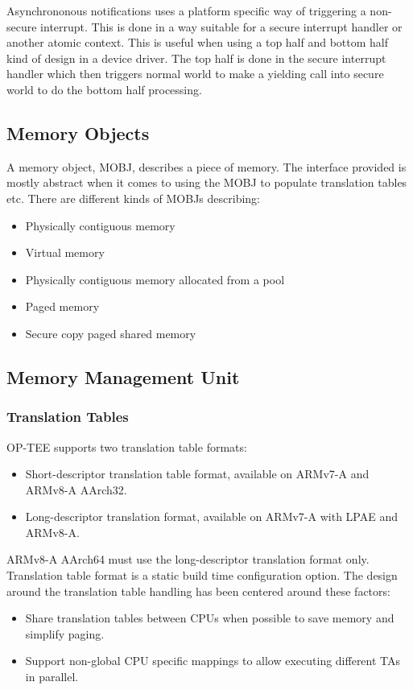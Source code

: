 \documentclass{article}
\begin{document}
Asynchrononous notifications uses a platform specific way of triggering a non-secure interrupt. This is done in a way suitable for a secure interrupt handler or another atomic context. This is useful when using a top half and bottom half kind of design in a device driver. The top half is done in the secure interrupt handler which then triggers normal world to make a yielding call into secure world to do the bottom half processing.

\subsection{Memory Objects}

A memory object, MOBJ, describes a piece of memory. The interface provided is mostly abstract when it comes to using the MOBJ to populate translation tables etc. There are different kinds of MOBJs describing:\begin{itemize}
\item Physically contiguous memory
\item Virtual memory
\item Physically contiguous memory allocated from a pool
\item Paged memory
\item Secure copy paged shared memory
\end{itemize}

\subsection{Memory Management Unit}

\subsubsection{Translation Tables}

OP-TEE supports two translation table formats:
\begin{itemize}
\item Short-descriptor translation table format, available on ARMv7-A and ARMv8-A AArch32.
\item Long-descriptor translation format, available on ARMv7-A with LPAE and ARMv8-A.
\end{itemize}
ARMv8-A AArch64 must use the long-descriptor translation format only. Translation table format is a static build time configuration option. The design around the translation table handling has been centered around these factors:
\begin{itemize}
\item Share translation tables between CPUs when possible to save memory and simplify paging.
\item Support non-global CPU specific mappings to allow executing different TAs in parallel.
\end{itemize}
\end{document}
